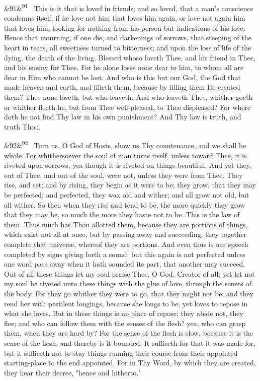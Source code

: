 \documentclass[12pt]{article}
\newcommand{\para}[1][]{\par\noindent\ifx&#1&\else\textsuperscript{\footnotesize #1}~\fi}
\begin{document}
\para[91] This is it that is loved in friends; and so loved, that a man's conscience condemns itself, if he love not him that loves him again, or love not again him that loves him, looking for nothing from his person but indications of his love. Hence that mourning, if one die, and darkenings of sorrows, that steeping of the heart in tears, all sweetness turned to bitterness; and upon the loss of life of the dying, the death of the living. Blessed whoso loveth Thee, and his friend in Thee, and his enemy for Thee. For he alone loses none dear to him, to whom all are dear in Him who cannot be lost. And who is this but our God, the God that made heaven and earth, and filleth them, because by filling them He created them? Thee none loseth, but who leaveth. And who leaveth Thee, whither goeth or whither fleeth he, but from Thee well-pleased, to Thee displeased? For where doth he not find Thy law in his own punishment? And Thy law is truth, and truth Thou.

\para[92] Turn us, O God of Hosts, show us Thy countenance, and we shall be whole. For whithersoever the soul of man turns itself, unless toward Thee, it is riveted upon sorrows, yea though it is riveted on things beautiful. And yet they, out of Thee, and out of the soul, were not, unless they were from Thee. They rise, and set; and by rising, they begin as it were to be; they grow, that they may be perfected; and perfected, they wax old and wither; and all grow not old, but all wither. So then when they rise and tend to be, the more quickly they grow that they may be, so much the more they haste not to be. This is the law of them. Thus much has Thou allotted them, because they are portions of things, which exist not all at once, but by passing away and succeeding, they together complete that universe, whereof they are portions. And even thus is our speech completed by signs giving forth a sound: but this again is not perfected unless one word pass away when it hath sounded its part, that another may succeed. Out of all these things let my soul praise Thee, O God, Creator of all; yet let not my soul be riveted unto these things with the glue of love, through the senses of the body. For they go whither they were to go, that they might not be; and they rend her with pestilent longings, because she longs to be, yet loves to repose in what she loves. But in these things is no place of repose; they abide not, they flee; and who can follow them with the senses of the flesh? yea, who can grasp them, when they are hard by? For the sense of the flesh is slow, because it is the sense of the flesh; and thereby is it bounded. It sufficeth for that it was made for; but it sufficeth not to stay things running their course from their appointed starting-place to the end appointed. For in Thy Word, by which they are created, they hear their decree, "hence and hitherto."
\end{document}
